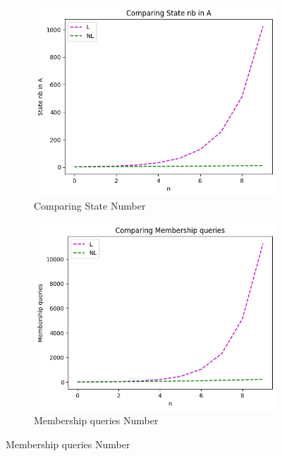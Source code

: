 \begin{figure}[!htb]
  \centering
  \begin{subfigure}[b]{0.3\textwidth}
    \includegraphics[width=\textwidth]{../statistics/plots/wrostDFA/State nb in A.png}
    \caption{Comparing State Number}
    \label{fig:StateWrostDFACompare}
  \end{subfigure}
  \begin{subfigure}[b]{0.3\textwidth}
    \includegraphics[width=\textwidth]{../statistics/plots/wrostDFA/Membership queries.png}
    \caption{Membership queries Number}
    \label{fig:MemberWrostDFACompare}
  \end{subfigure}

\end{figure}
